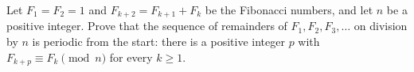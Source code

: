 Let $F_1=F_2=1$ and $F_{k+2}=F_{k+1}+F_k$ be the Fibonacci numbers, and let $n$ be a positive integer. Prove that the sequence of remainders of $F_1,F_2,F_3,\dots$ on division by $n$ is periodic from the start: there is a positive integer $p$ with $F_{k+p}\equiv F_k\pmod n$ for every $k\ge1$.
